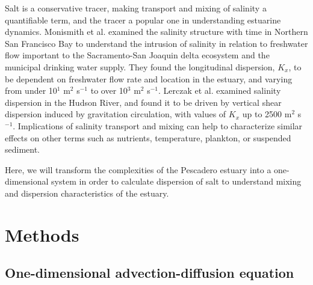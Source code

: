 Salt is a conservative tracer, making transport and mixing of salinity a quantifiable term, and the tracer a popular one in understanding estuarine dynamics. Monismith et al. \parencite*{monismith_structure_2002} examined the salinity structure with time in Northern San Francisco Bay to understand the intrusion of salinity in relation to freshwater flow important to the Sacramento-San Joaquin delta ecosystem and the municipal drinking water supply. They found the longitudinal dispersion, $K_x$, to be dependent on freshwater flow rate and location in the estuary, and varying from under 10$^1$ m$^2$ s$^{-1}$ to over 10$^3$ m$^2$ s$^{-1}$. Lerczak et al. \parencite*{lerczak_mechanisms_2006} examined salinity dispersion in the Hudson River, and found it to be driven by vertical shear dispersion induced by gravitation circulation, with values of $K_x$ up to 2500 m$^2$ s$^{-1}$. Implications of salinity transport and mixing can help to characterize similar effects on other terms such as nutrients, temperature, plankton, or suspended sediment. 

Here, we will transform the complexities of the Pescadero estuary into a one-dimensional system in order to calculate dispersion of salt to understand mixing and dispersion characteristics of the estuary.


\section{Methods} \label{sec:ch4methods}

\subsection{One-dimensional advection-diffusion equation} \label{ssec:1dadvdif}

